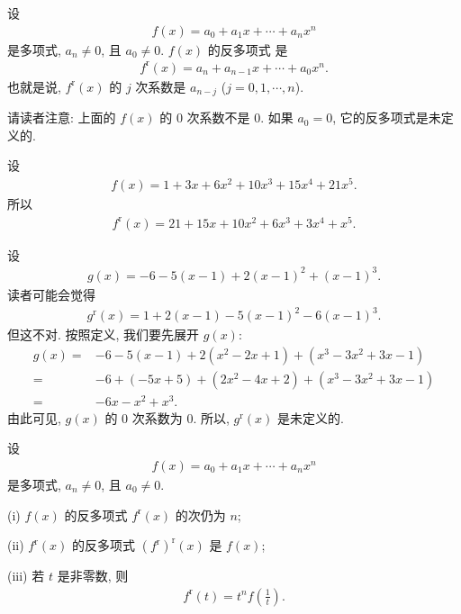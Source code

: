 \begin{definition}
    设
    \begin{align*}
        f(x) = a_0 + a_1 x + \cdots + a_n x^n
    \end{align*}
    是多项式, $a_n \neq 0$, 且 $a_0 \neq 0$. $f(x)$ 的反多项式  是
    \begin{align*}
        f^{\mathrm{r}} (x) = a_n + a_{n-1} x + \cdots + a_0 x^n.
    \end{align*}
    也就是说, $f^{\mathrm{r}} (x)$ 的 $j$ 次系数是 $a_{n-j}$ ($j = 0,1,\cdots,n$).

    请读者注意: 上面的 $f(x)$ 的 $0$ 次系数不是 $0$. 如果 $a_0 = 0$, 它的反多项式是未定义的.
\end{definition}

\begin{example}
    设
    \begin{align*}
        f(x) = 1 + 3x + 6x^2 + 10x^3 + 15x^4 + 21x^5.
    \end{align*}
    所以
    \begin{align*}
        f^{\mathrm{r}} (x) = 21 + 15x + 10x^2 + 6x^3 + 3x^4 + x^5.
    \end{align*}
\end{example}

\begin{example}
    设
    \begin{align*}
        g(x) = -6 - 5 (x - 1) + 2 (x - 1)^2 + (x - 1)^3.
    \end{align*}
    读者可能会觉得
    \begin{align*}
        g^{\mathrm{r}} (x) = 1 + 2 (x - 1) - 5 (x - 1)^2 - 6 (x - 1)^3.
    \end{align*}
    但这不对. 按照定义, 我们要先展开 $g(x)$:
    \begin{align*}
        g(x)
        = {} & -6 - 5(x - 1) + 2 (x^2 - 2x + 1) + (x^3 - 3x^2 + 3x - 1) \\
        = {} & -6 + (-5x + 5) + (2x^2 - 4x + 2) + (x^3 - 3x^2 + 3x - 1) \\
        = {} & -6x - x^2 + x^3.
    \end{align*}
    由此可见, $g(x)$ 的 $0$ 次系数为 $0$. 所以, $g^{\mathrm{r}} (x)$ 是未定义的.
\end{example}

\begin{proposition}
    设
    \begin{align*}
        f(x) = a_0 + a_1 x + \cdots + a_n x^n
    \end{align*}
    是多项式, $a_n \neq 0$, 且 $a_0 \neq 0$.

    (i) $f(x)$ 的反多项式 $f^{\mathrm{r}} (x)$ 的次仍为 $n$;

    (ii) $f^{\mathrm{r}}(x)$ 的反多项式 $(f^{\mathrm{r}})^{\mathrm{r}} (x)$ 是 $f(x)$;

    (iii) 若 $t$ 是非零数, 则
    \begin{align*}
        f^{\mathrm{r}} (t) = t^n f \left( \frac{1}{t} \right).
    \end{align*}
\end{proposition}

